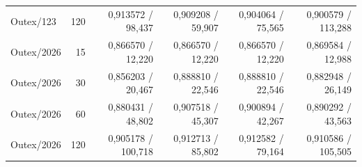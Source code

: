 \begin{table}[!htbp]
\begin{tabular}{@{}lrrrrr@{}}
Outex/123 & 120 & 0,913572 / 98,437 & 0,909208 / 59,907 & 0,904064 / 75,565 & 0,900579 / 113,288\\
Outex/2026 & 15 & 0,866570 / 12,220 & 0,866570 / 12,220 & 0,866570 / 12,220 & 0,869584 / 12,988\\
Outex/2026 & 30 & 0,856203 / 20,467 & 0,888810 / 22,546 & 0,888810 / 22,546 & 0,882948 / 26,149\\
Outex/2026 & 60 & 0,880431 / 48,802 & 0,907518 / 45,307 & 0,900894 / 42,267 & 0,890292 / 43,563\\
Outex/2026 & 120 & 0,905178 / 100,718 & 0,912713 / 85,802 & 0,912582 / 79,164 & 0,910586 / 105,505\\
\bottomrule
\end{tabular}
\end{table}
